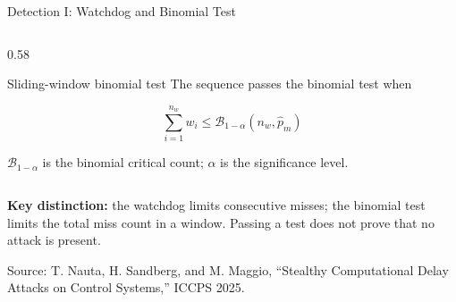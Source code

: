 \documentclass[9pt,aspectratio=169]{beamer}
\newcommand{\paperref}{\tiny Source: T. Nauta, H. Sandberg, and M. Maggio, ``Stealthy Computational Delay Attacks on Control Systems,'' ICCPS 2025.}
\begin{document}
\begin{frame}{Detection I: Watchdog and Binomial Test}
\begin{columns}[T,onlytextwidth]
\begin{column}{0.58\textwidth}
\begin{block}{Sliding-window binomial test}
The sequence passes the binomial test when

\[
\boxed{
\sum_{i=1}^{n_w}w_i
\leq
\mathcal B_{1-\alpha}(n_w,\hat p_m)
}
\]

\scriptsize
$\mathcal B_{1-\alpha}$ is the binomial critical count;
$\alpha$ is the significance level.

\end{block}

\end{column}
\end{columns}

\vspace{1mm}

{\scriptsize
\textbf{Key distinction:} the watchdog limits consecutive
misses; the binomial test limits the total miss count in a
window. Passing a test does not prove that no attack is present.
}

\vfill
{\paperref}

\end{frame}
\end{document}
